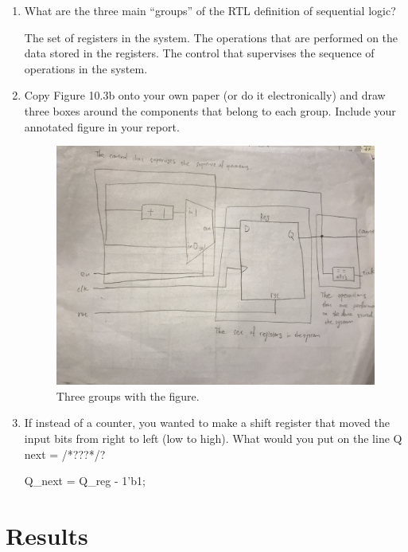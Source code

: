 \documentclass[11pt]{article}
\begin{document}
\begin{enumerate}
	\item What are the three main “groups” of the RTL definition of sequential logic?
	
	The set of registers in the system.
	The operations that are performed on the data stored in the registers.
	The control that supervises the sequence of operations in the system.
	
	\item Copy Figure 10.3b onto your own paper (or do it electronically) and draw three boxes around the components that belong to each group. Include your annotated figure in your report.
	
\begin{figure}[ht]\centering
	\includegraphics[width=\textwidth]{Q2}
	\caption{Three groups with the figure.}
	\label{fig:groups}			%
\end{figure}

	\item If instead of a counter, you wanted to make
	a shift register that moved the input bits
	from right to left (low to high). What would
	you put on the line Q next = /*???*/?
	
	Q\_next = Q\_reg - 1'b1;
	\clearpage
\end{enumerate}


\section*{Results}
\end{document}
